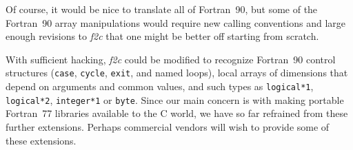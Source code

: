 \documentclass[10pt,a4paper]{article}
\begin{document}
Of course, it would be nice to translate all of Fortran~90, but some of the Fortran~90 array manipulations would require new calling conventions and large enough revisions to \emph{f2c} that one might be better off starting from scratch.

With sufficient hacking, \emph{f2c} could be modified to recognize Fortran~90 control structures (\verb|case|, \verb|cycle|, \verb|exit|, and named loops), local arrays of dimensions that depend on arguments and common values, and such types as \verb|logical*1|, \verb|logical*2|, \verb|integer*1| or \verb|byte|. Since our main concern is with making portable Fortran~77 libraries available to the C world, we have so far refrained from these further extensions. Perhaps commercial vendors will wish to provide some of these extensions.


\renewcommand{\bibsection}{\section{REFERENCES}}

\end{document}
